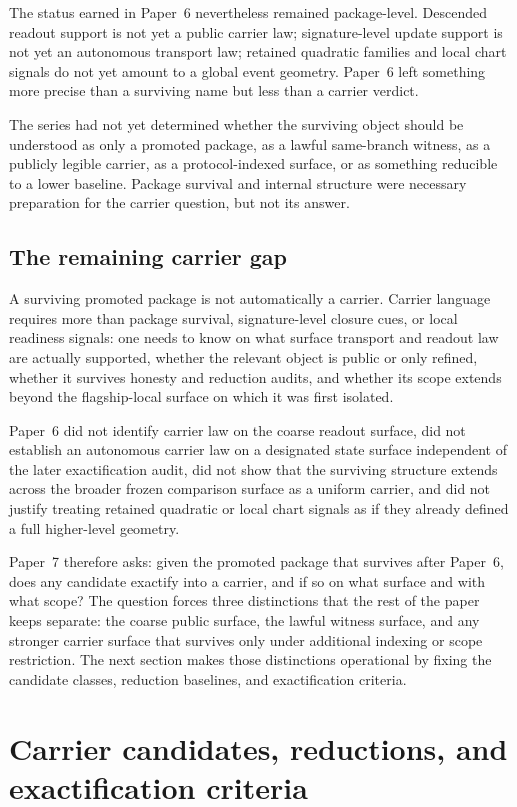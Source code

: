 \documentclass[11pt]{article}
\theoremstyle{definition}
\begin{document}
The status earned in Paper~6 nevertheless remained package-level. Descended readout
support is not yet a public carrier law; signature-level update support is not yet an
autonomous transport law; retained quadratic families and local chart signals do not
yet amount to a global event geometry. Paper~6 left something more precise than a
surviving name but less than a carrier verdict.

The series had not yet determined whether the surviving object should be understood as
only a promoted package, as a lawful same-branch witness, as a publicly legible
carrier, as a protocol-indexed surface, or as something reducible to a lower baseline.
Package survival and internal structure were necessary preparation for the carrier
question, but not its answer.

\subsection{The remaining carrier gap}

A surviving promoted package is not automatically a carrier. Carrier language requires
more than package survival, signature-level closure cues, or local readiness signals:
one needs to know on what surface transport and readout law are actually supported,
whether the relevant object is public or only refined, whether it survives honesty and
reduction audits, and whether its scope extends beyond the flagship-local surface on
which it was first isolated.

Paper~6 did not identify carrier law on the coarse readout surface, did not establish
an autonomous carrier law on a designated state surface independent of the later
exactification audit, did not show that the surviving structure extends across the
broader frozen comparison surface as a uniform carrier, and did not justify treating
retained quadratic or local chart signals as if they already defined a full
higher-level geometry.

Paper~7 therefore asks: given the promoted package that survives after Paper~6, does
any candidate exactify into a carrier, and if so on what surface and with what scope?
The question forces three distinctions that the rest of the paper keeps separate: the
coarse public surface, the lawful witness surface, and any stronger carrier surface
that survives only under additional indexing or scope restriction. The next section
makes those distinctions operational by fixing the candidate classes, reduction
baselines, and exactification criteria.
 \section{Carrier candidates, reductions, and exactification criteria}
\label{sec:candidate-classes-reductions-criteria}
\end{document}
